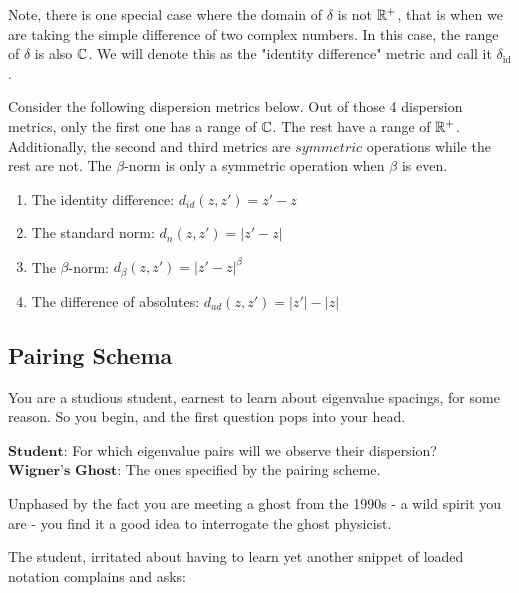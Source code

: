 Note, there is one special case where the domain of $\delta$ is not $\mathbb{R}^+$, that is when we are taking the simple difference of two complex numbers. In this case, the range of $\delta$ is also $\mathbb{C}$. We will denote this as the "identity difference" metric and call it $\delta_{\text{id}}$. 

Consider the following dispersion metrics below. Out of those 4 dispersion metrics, only the first one has a range of $\mathbb{C}$. The rest have a range of $\mathbb{R}^+$. Additionally, the second and third metrics are $\textit{symmetric}$ operations while the rest are not. The $\beta$-norm is only a symmetric operation when $\beta$ is even.

\begin{enumerate}
\item The identity difference: $d_{id}(z,z') = z' - z$
\item The standard norm: $d_{n}(z,z') = |z' - z|$
\item The $\beta$-norm: $d_\beta(z,z') = |z' - z|^\beta$
\item The difference of absolutes: $d_{ad}(z,z') = |z'| - |z|$
\end{enumerate}


\subsection{Pairing Schema}


You are a studious student, earnest to learn about eigenvalue spacings, for some reason. So you begin, and the first question pops into your head.

$\textbf{Student:}$ For which eigenvalue pairs will we observe their dispersion? \hfill \newline
$\textbf{Wigner's Ghost:}$ The ones specified by the pairing scheme.

Unphased by the fact you are meeting a ghost from the 1990s - a wild spirit you are - you find it a good idea to interrogate the ghost physicist.

The student, irritated about having to learn yet another snippet of loaded notation complains and asks:

